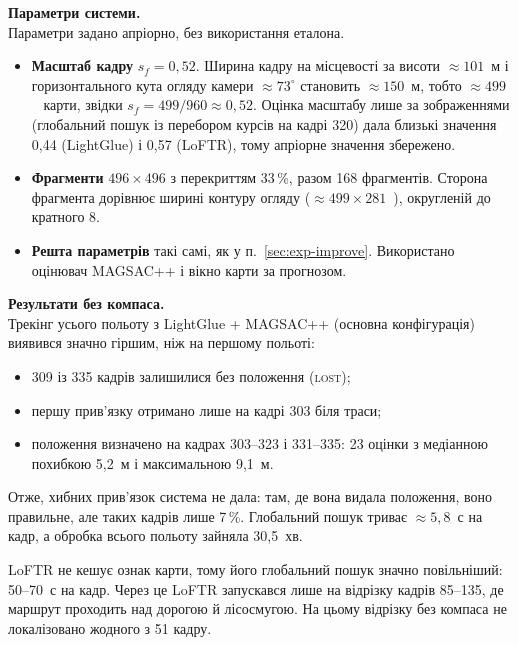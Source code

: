 \documentclass[a4paper, 12pt, titlepage]{article}
\begin{document}
\textbf{Параметри системи.}\\
Параметри задано апріорно, без використання еталона.
\begin{itemize}
    \item \textbf{Масштаб кадру} $s_f = 0{,}52$. Ширина кадру на місцевості за висоти $\approx 101$~м і горизонтального кута огляду камери $\approx 73^\circ$ становить $\approx 150$~м, тобто $\approx 499$~\px{} карти, звідки $s_f = 499 / 960 \approx 0{,}52$. Оцінка масштабу лише за зображеннями (глобальний пошук із перебором курсів на кадрі 320) дала близькі значення 0,44 (LightGlue) і 0,57 (LoFTR), тому апріорне значення збережено.
    \item \textbf{Фрагменти} $496 \times 496$ з перекриттям 33\,\%, разом 168 фрагментів. Сторона фрагмента дорівнює ширині контуру огляду ($\approx 499 \times 281$~\px{}), округленій до кратного 8.
    \item \textbf{Решта параметрів} такі самі, як у п.~\ref{sec:exp-improve}. Використано оцінювач MAGSAC++ і вікно карти за прогнозом.
\end{itemize}

\textbf{Результати без компаса.}\\
Трекінг усього польоту з LightGlue + MAGSAC++ (основна конфігурація) виявився значно гіршим, ніж на першому польоті:
\begin{itemize}
    \item 309 із 335 кадрів залишилися без положення (\textsc{lost});
    \item першу прив'язку отримано лише на кадрі 303 біля траси;
    \item положення визначено на кадрах 303--323 і 331--335: 23 оцінки з медіанною похибкою 5,2~м і максимальною 9,1~м.
\end{itemize}
Отже, хибних прив'язок система не дала: там, де вона видала положення, воно правильне, але таких кадрів лише 7\,\%. Глобальний пошук триває $\approx 5{,}8$~с на кадр, а обробка всього польоту зайняла 30,5~хв.

LoFTR не кешує ознак карти, тому його глобальний пошук значно повільніший: 50--70~с на кадр. Через це LoFTR запускався лише на відрізку кадрів 85--135, де маршрут проходить над дорогою й лісосмугою. На цьому відрізку без компаса не локалізовано жодного з 51 кадру.
\end{document}
